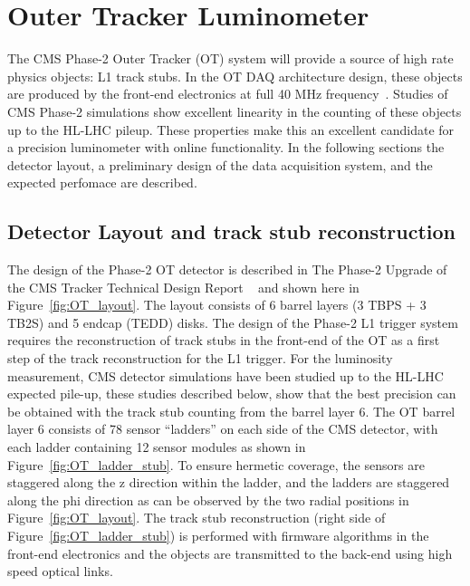\chapter{Outer Tracker Luminometer}

The CMS Phase-2 Outer Tracker  (OT) system will provide a source of high rate physics objects: L1 track stubs.
In the OT DAQ architecture design, these objects are produced by the front-end electronics at full 40 MHz frequency~\cite{CERN-LHCC-2017-009}.
Studies of CMS Phase-2 simulations show excellent linearity in the counting of these objects up to the HL-LHC pileup.
These properties make this an excellent candidate for a precision luminometer with online functionality.
In the following sections the detector layout, a preliminary design of the data acquisition system, and the expected perfomace are described.


\section{Detector Layout and track stub reconstruction}


The design of the Phase-2 OT detector is described in The Phase-2 Upgrade of the
CMS Tracker Technical Design Report ~\cite{CERN-LHCC-2017-009} and shown here in Figure~\ref{fig:OT_layout}.
The layout consists of 6 barrel layers (3 TBPS + 3 TB2S) and 5 endcap (TEDD) disks.
The design of the  Phase-2 L1 trigger system requires the reconstruction of track stubs
in the front-end of the OT as a first step of the track reconstruction for the L1 trigger.
For the luminosity measurement, CMS detector simulations have been studied up to the HL-LHC expected pile-up,
these studies described below, show that the best precision can be obtained with the track stub counting from the barrel layer 6. 
The OT barrel layer 6 consists of 78 sensor ``ladders'' on each side of the CMS detector,
with each ladder containing 12 sensor modules as shown in Figure~\ref{fig:OT_ladder_stub}.
To ensure hermetic coverage, the sensors are staggered along the z direction within the ladder,
and the ladders are staggered along the phi direction as can be observed by the two radial positions in Figure~\ref{fig:OT_layout}.
The track stub reconstruction (right side of Figure~\ref{fig:OT_ladder_stub}) is performed with firmware algorithms
in the front-end electronics and the objects are transmitted to the back-end using high speed optical links.


